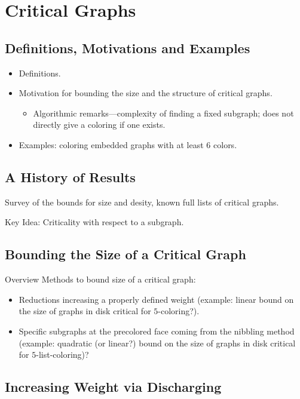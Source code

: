 \documentclass[12pt,twoside,openright,a4paper]{book}
\begin{document}
\chapter{Critical Graphs}


\section{Definitions, Motivations and Examples}

\begin{itemize}
\item Definitions.
\item Motivation for bounding the size and the structure of critical graphs.
\begin{itemize}
\item Algorithmic remarks---complexity of finding a fixed subgraph; does not directly
give a coloring if one exists.
\end{itemize}
\item Examples: coloring embedded graphs with at least $6$ colors.
\end{itemize}

\section{A History of Results}

Survey of the bounds for size and desity, known full lists of critical graphs.

Key Idea: Criticality with respect to a subgraph.

\section{Bounding the Size of a Critical Graph}

Overview Methods to bound size of a critical graph:
\begin{itemize}
\item Reductions increasing a properly defined weight (example: linear bound on the size of graphs in disk
critical for $5$-coloring?).
\item Specific subgraphs at the precolored face coming from the nibbling method (example: quadratic (or linear?) bound
on the size of graphs in disk critical for $5$-list-coloring)?
\end{itemize}

\section{Increasing Weight via Discharging}
\end{document}
